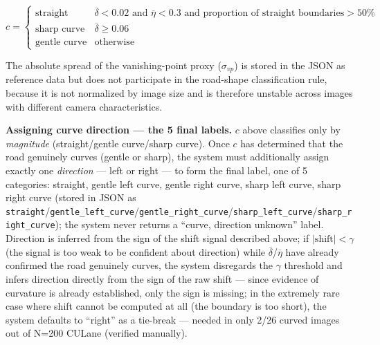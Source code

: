 \documentclass[12pt,a4paper]{report}
\begin{document}
\[
c = \begin{cases}
\text{straight} & \overline{\delta} < 0.02 \text{ and } \overline{\eta} < 0.3 \text{ and proportion of straight boundaries} > 50\% \\
\text{sharp curve} & \overline{\delta} \ge 0.06 \\
\text{gentle curve} & \text{otherwise}
\end{cases}
\]

The absolute spread of the vanishing-point proxy ($\sigma_{vp}$) is stored in the JSON as reference data but does not participate in the road-shape classification rule, because it is not normalized by image size and is therefore unstable across images with different camera characteristics.

\textbf{Assigning curve direction --- the 5 final labels.} $c$ above classifies only by \textit{magnitude} (straight/gentle curve/sharp curve). Once $c$ has determined that the road genuinely curves (gentle or sharp), the system must additionally assign exactly one \textit{direction} --- left or right --- to form the final label, one of 5 categories: straight, gentle left curve, gentle right curve, sharp left curve, sharp right curve (stored in JSON as \texttt{straight}/\texttt{gentle\_left\_curve}/\texttt{gentle\_right\_curve}/\texttt{sharp\_left\_curve}/\texttt{sharp\_right\_curve}); the system never returns a ``curve, direction unknown'' label. Direction is inferred from the sign of the shift signal described above; if $|\text{shift}| < \gamma$ (the signal is too weak to be confident about direction) while $\overline{\delta}$/$\overline{\eta}$ have already confirmed the road genuinely curves, the system disregards the $\gamma$ threshold and infers direction directly from the sign of the raw shift --- since evidence of curvature is already established, only the sign is missing; in the extremely rare case where shift cannot be computed at all (the boundary is too short), the system defaults to ``right'' as a tie-break --- needed in only 2/26 curved images out of N=200 CULane (verified manually).
\end{document}
